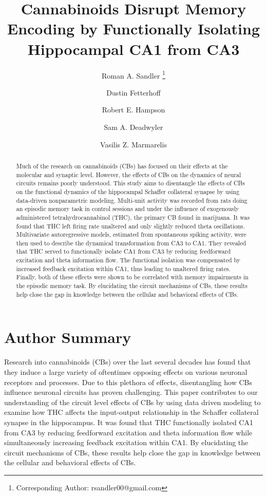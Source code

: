 \documentclass[11pt,a4paper,final]{article}
\title{\vspace{-30mm}\fontsize{14pt}{1pt}\textbf{Cannabinoids Disrupt Memory Encoding by Functionally Isolating Hippocampal CA1 from CA3}} %
\author[1]{Roman A. Sandler     \thanks{Corresponding Author: rsandler00@gmail.com}}
\author[2]{Dustin Fetterhoff    }   %
\author[2]{Robert E. Hampson    }	%
\author[2]{Sam A. Deadwyler     }	%
\author[1]{Vasilis Z. Marmarelis}
\affil[1]{Department of Biomedical Engineering, University of Southern California, Los Angeles, CA, USA}
\affil[2]{Department of Physiology \& Pharmacology, Wake Forest University, Winston-Salem, NC, USA}
\begin{document}
\maketitle %

\begin{abstract}
Much of the research on cannabinoids (CBs) has focused on their effects at the molecular and synaptic level.
However, the effects of CBs on the dynamics of neural circuits remains poorly understood.
This study aims to disentangle the effects of CBs on the functional dynamics of the hippocampal Schaffer collateral synapse by using data-driven nonparametric modeling.
Multi-unit activity was recorded from rats doing an episodic memory task in control sessions and under the influence of exogenously administered tetrahydrocannabinol (THC), the primary CB found in marijuana.
It was found that THC left firing rate unaltered and only slightly reduced theta oscillations.
Multivariate autoregressive models, estimated from spontaneous spiking activity, were then used to describe the dynamical transformation from CA3 to CA1.
They revealed that THC served to functionally isolate CA1 from CA3 by reducing feedforward excitation and theta information flow.
The functional isolation was compensated by increased feedback excitation within CA1, thus leading to unaltered firing rates.
Finally, both of these effects were shown to be correlated with memory impairments in the episodic memory task.
By elucidating the circuit mechanisms of CBs, these results help close the gap in knowledge between the cellular and behavioral effects of CBs.
\end{abstract}

\section*{Author Summary}
Research into cannabinoids (CBs) over the last several decades has found that they induce a large variety of oftentimes opposing effects on various neuronal receptors and processes.
Due to this plethora of effects, disentangling how CBs influence neuronal circuits has proven challenging.
This paper contributes to our understanding of the circuit level effects of CBs by using data driven modeling to examine how THC affects the input-output relationship in the Schaffer collateral synapse in the hippocampus.
It was found that THC functionally isolated CA1 from CA3 by reducing feedforward excitation and theta information flow while simultaneously increasing feedback excitation within CA1.
By elucidating the circuit mechanisms of CBs, these results help close the gap in knowledge between the cellular and behavioral effects of CBs.
\end{document}
